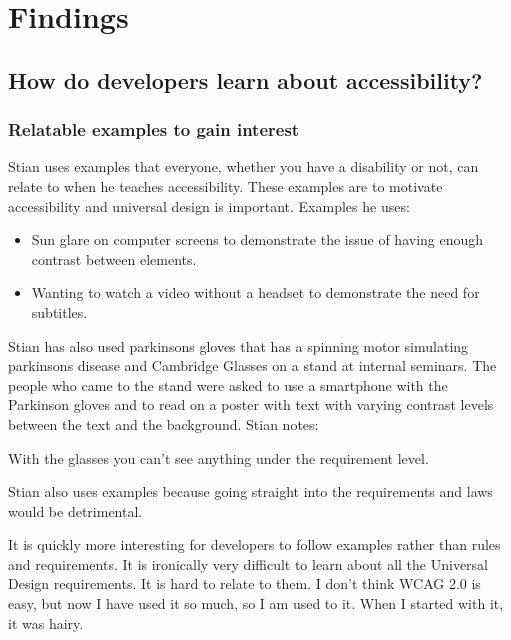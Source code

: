 \chapter{Findings}

\section{How do developers learn about accessibility?}

\subsection{Relatable examples to gain interest}
Stian uses examples that everyone, whether you have a disability or not, can relate to when he teaches accessibility. These examples are to motivate accessibility and universal design is important. Examples he uses:
\begin{itemize}
    \item Sun glare on computer screens to demonstrate the issue of having enough contrast between elements.
    \item Wanting to watch a video without a headset to demonstrate the need for subtitles.
\end{itemize}

Stian has also used parkinsons gloves that has a spinning motor simulating parkinsons disease and Cambridge Glasses on a stand at internal seminars. The people who came to the stand were asked to use a smartphone with the Parkinson gloves and to read on a poster with text with varying contrast levels between the text and the background. Stian notes:

\begin{displayquote}
    With the glasses you can't see anything under the requirement level.
\end{displayquote}

Stian also uses examples because going straight into the requirements and laws would be detrimental.

\begin{displayquote}
    It is quickly more interesting for developers to follow examples rather than rules and requirements. It is ironically very difficult to learn about all the Universal Design requirements. It is hard to relate to them. I don’t think WCAG 2.0 is easy, but now I have used it so much, so I am used to it. When I started with it, it was hairy.
\end{displayquote}


